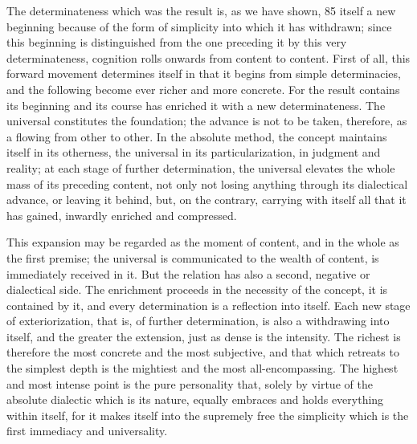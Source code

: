 The determinateness which was the result is, as we have shown, 85 itself
a new beginning because of the form of simplicity into which it has
withdrawn; since this beginning is distinguished from the one preceding
it by this very determinateness, cognition rolls onwards from content to
content. First of all, this forward movement determines itself in that it
begins from simple determinacies, and the following become ever richer
and more concrete. For the result contains its beginning and its course
has enriched it with a new determinateness. The universal constitutes the
foundation; the advance is not to be taken, therefore, as a flowing from
other to other. In the absolute method, the concept maintains itself in its
otherness, the universal in its particularization, in judgment and reality; at
each stage of further determination, the universal elevates the whole mass of
its preceding content, not only not losing anything through its dialectical
advance, or leaving it behind, but, on the contrary, carrying with itself all
that it has gained, inwardly enriched and compressed.

This expansion may be regarded as the moment of content, and in the
whole as the first premise; the universal is communicated to the wealth of
content, is immediately received in it. But the relation has also a second,
negative or dialectical side. The enrichment proceeds in the necessity of the
concept, it is contained by it, and every determination is a reflection into
itself. Each new stage of exteriorization, that is, of further determination, is
also a withdrawing into itself, and the greater the extension, just as dense
is the intensity. The richest is therefore the most concrete and the most
subjective, and that which retreats to the simplest depth is the mightiest
and the most all-encompassing. The highest and most intense point is the
pure personality that, solely by virtue of the absolute dialectic which is its
nature, equally embraces and holds everything within itself, for it makes
itself into the supremely free
 the simplicity which is the first immediacy
and universality.

